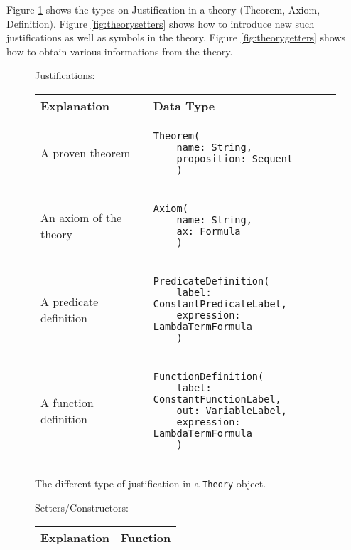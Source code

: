 Figure \ref{fig:justifications} shows the types on Justification in a theory (Theorem, Axiom, Definition). Figure \ref{fig:theorysetters} shows how to introduce new such justifications as well as symbols in the theory. Figure \ref{fig:theorygetters} shows how to obtain various informations from the theory.



{
\def\arraystretch{4}
\begin{figure}
Justifications:
\begin{center}
\begin{tabular}{l|l}
Explanation & Data Type
\\ \hline

A proven theorem & 
\begin{lstlisting}
Theorem(
	name: String,
	proposition: Sequent
	)

\end{lstlisting}
\\ %

An axiom of the theory & 
\begin{lstlisting}
Axiom(
	name: String,
	ax: Formula
	)

\end{lstlisting}
\\ %

A predicate definition & 
\begin{lstlisting}
PredicateDefinition(
	label: ConstantPredicateLabel,
	expression: LambdaTermFormula
	)

\end{lstlisting} 
\\ %

A function definition & 
\begin{lstlisting}
FunctionDefinition(
	label: ConstantFunctionLabel,
	out: VariableLabel,
	expression: LambdaTermFormula
	)

\end{lstlisting}
\\ %

\end{tabular}
\caption{The different type of justification in a \lstinline{Theory}{} object. \label{fig:justifications}}
\end{center}
\end{figure}

\begin{figure}
Setters/Constructors:
\begin{center}
\begin{tabular}{l|l}
Explanation & Function
\\ \hline


\end{tabular}
\end{center}
\end{figure}}
